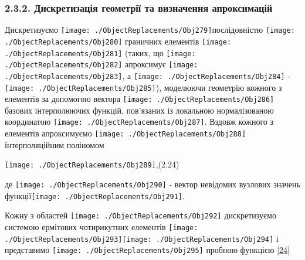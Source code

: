 \hypertarget{ux434ux438ux441ux43aux440ux435ux442ux438ux437ux430ux446ux456ux44f-ux433ux435ux43eux43cux435ux442ux440ux456ux457-ux442ux430-ux432ux438ux437ux43dux430ux447ux435ux43dux43dux44f-ux430ux43fux440ux43eux43aux441ux438ux43cux430ux446ux456ux439}{%
\subsubsection[2.3.2. Дискретизація геометрії та визначення
апроксимацій]{\texorpdfstring{\protect\hypertarget{anchor-37}{}{}\protect\hypertarget{anchor-38}{}{}2.3.2.
Дискретизація геометрії та визначення
апроксимацій}{2.3.2. Дискретизація геометрії та визначення апроксимацій}}\label{ux434ux438ux441ux43aux440ux435ux442ux438ux437ux430ux446ux456ux44f-ux433ux435ux43eux43cux435ux442ux440ux456ux457-ux442ux430-ux432ux438ux437ux43dux430ux447ux435ux43dux43dux44f-ux430ux43fux440ux43eux43aux441ux438ux43cux430ux446ux456ux439}}

Дискретизуємо
\texttt{[image: ./ObjectReplacements/Obj279]}послідовністю
\texttt{[image: ./ObjectReplacements/Obj280]}
граничних елементів
\texttt{[image: ./ObjectReplacements/Obj281]}
(таких, що
\texttt{[image: ./ObjectReplacements/Obj282]}
апроксимує
\texttt{[image: ./ObjectReplacements/Obj283]},
а
\texttt{[image: ./ObjectReplacements/Obj284]}
-
\texttt{[image: ./ObjectReplacements/Obj285]}),
моделюючи геометрію кожного з елементів за допомогою вектора
\texttt{[image: ./ObjectReplacements/Obj286]}
базових інтерполюючих функцій, пов'язаних із локальною нормалізованою
координатою
\texttt{[image: ./ObjectReplacements/Obj287]}.
Вздовж кожного з елементів апроксимуємо
\texttt{[image: ./ObjectReplacements/Obj288]}
інтерполяційним поліномом

\texttt{[image: ./ObjectReplacements/Obj289]},(2.24)

де
\texttt{[image: ./ObjectReplacements/Obj290]}
- вектор невідомих вузлових значень
функції\texttt{[image: ./ObjectReplacements/Obj291]}.

Кожну з областей
\texttt{[image: ./ObjectReplacements/Obj292]}
дискретизуємо системою ермітових чотирикутних елементів
\texttt{[image: ./ObjectReplacements/Obj293]}\texttt{[image: ./ObjectReplacements/Obj294]}
і представимо
\texttt{[image: ./ObjectReplacements/Obj295]}
пробною функцією {[}\protect\hyperlink{anchor-39}{24}{]}

